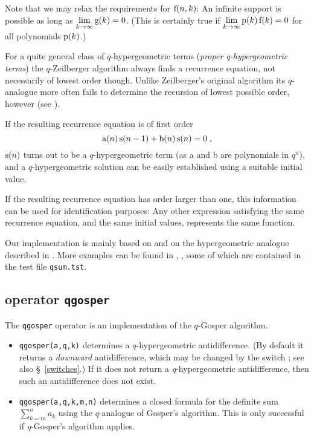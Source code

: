 Note that we may relax the requirements for ${\mathrm f}(n,k)$:
An infinite support is possible as long as
$\lim\limits_{k\rightarrow\infty}{{\mathrm g}(k)}=0$.
(This is certainly true if
$\lim\limits_{k\rightarrow\infty}{{\mathrm p}(k)\,{\mathrm f}(k)}=0$ for
all polynomials ${\mathrm p}(k)$.)

For a quite general class of $q$-hypergeometric terms
(\textsl{proper q-hypergeometric terms}) the $q$-Zeilberger algorithm
always finds a recurrence equation, not necessarily of lowest
order though. Unlike Zeilberger's original algorithm its
$q$-analogue more often fails to determine the recursion of
lowest possible order, however (see \cite{PauleRiese:95}).

If the resulting recurrence equation is of first order
\[
	{\mathrm a}(n)\,{\mathrm s}(n-1)+{\mathrm b}(n)\,{\mathrm s}(n)=0
\;,
\]
${\mathrm s}(n)$ turns out to be a $q$-hypergeometric term
(as a and b are polynomials in $q^n$),
and a $q$-hypergeometric solution can be easily established using a
suitable initial value.

If the resulting recurrence equation has order larger than one,
this information can be used for identification purposes:
Any other expression satisfying the same recurrence equation, and the same
initial values, represents the same function.

Our implementation is mainly based on \cite{Koornwinder:93} and on the
hypergeometric analogue described in \cite{Koepf:95e}.
More examples can be found in \cite{GasperRahman:90}, \cite{Gasper:95},
some of which are contained in the test file
\texttt{qsum.tst}.


\subsection{\REDUCE{} operator \texttt{qgosper}}
\label{reduce_qgosper}

The \texttt{qgosper} operator is an implementation of the $q$-Gosper
algorithm.
\begin{itemize}
	\item \texttt{qgosper(a,q,k)} determines a $q$-hypergeometric
		antidifference. (By default it returns a \textsl{downward}
		antidifference, which may be changed by the switch
		; see also
		\S~\ref{switches}.)
		If it does not return a \textsl{q}-hypergeometric antidifference,
		then such an antidifference does not exist.
	\item \texttt{qgosper(a,q,k,m,n)} determines a closed formula
		for the definite sum $\sum\limits_{k=m}^n a_k$ using the
		$q$-analogue of Gosper's algorithm.
		This is only successful if \textsl{q}-Gosper's algorithm applies.
\end{itemize}

